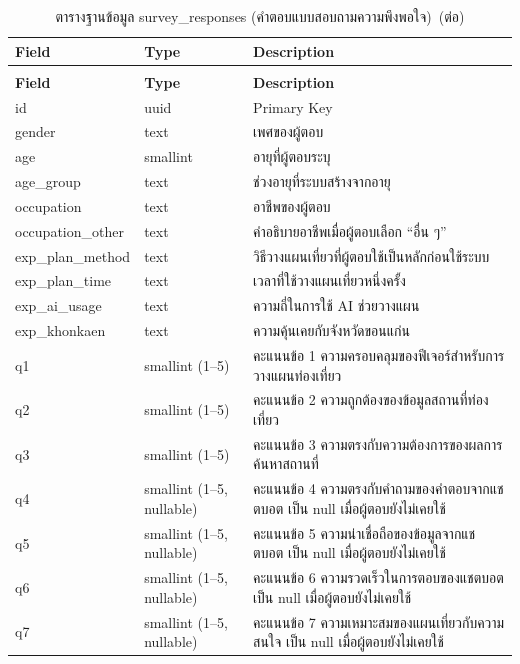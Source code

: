 \begin{longtable}{|p{3.6cm}|p{2.6cm}|p{6.8cm}|}
\caption{ตารางฐานข้อมูล survey\_responses (คำตอบแบบสอบถามความพึงพอใจ)}\label{tab:db_survey}\\
\hline
\textbf{Field} & \textbf{Type} & \textbf{Description} \\
\hline
\endfirsthead
\caption[]{ตารางฐานข้อมูล survey\_responses (คำตอบแบบสอบถามความพึงพอใจ)~(\textnormal{ต่อ})}\\
\hline
\textbf{Field} & \textbf{Type} & \textbf{Description} \\
\hline
\endhead
id & uuid & Primary Key \\ \hline
gender & text & เพศของผู้ตอบ \\ \hline
age & smallint & อายุที่ผู้ตอบระบุ \\ \hline
age\_group & text & ช่วงอายุที่ระบบสร้างจากอายุ \\ \hline
occupation & text & อาชีพของผู้ตอบ \\ \hline
occupation\_other & text & คำอธิบายอาชีพเมื่อผู้ตอบเลือก ``อื่น ๆ'' \\ \hline
exp\_plan\_method & text & วิธีวางแผนเที่ยวที่ผู้ตอบใช้เป็นหลักก่อนใช้ระบบ \\ \hline
exp\_plan\_time & text & เวลาที่ใช้วางแผนเที่ยวหนึ่งครั้ง \\ \hline
exp\_ai\_usage & text & ความถี่ในการใช้ AI ช่วยวางแผน \\ \hline
exp\_khonkaen & text & ความคุ้นเคยกับจังหวัดขอนแก่น \\ \hline
q1 & smallint (1--5) & คะแนนข้อ 1 ความครอบคลุมของฟีเจอร์สำหรับการวางแผนท่องเที่ยว \\ \hline
q2 & smallint (1--5) & คะแนนข้อ 2 ความถูกต้องของข้อมูลสถานที่ท่องเที่ยว \\ \hline
q3 & smallint (1--5) & คะแนนข้อ 3 ความตรงกับความต้องการของผลการค้นหาสถานที่ \\ \hline
q4 & smallint (1--5, nullable) & คะแนนข้อ 4 ความตรงกับคำถามของคำตอบจากแชตบอต เป็น null เมื่อผู้ตอบยังไม่เคยใช้ \\ \hline
q5 & smallint (1--5, nullable) & คะแนนข้อ 5 ความน่าเชื่อถือของข้อมูลจากแชตบอต เป็น null เมื่อผู้ตอบยังไม่เคยใช้ \\ \hline
q6 & smallint (1--5, nullable) & คะแนนข้อ 6 ความรวดเร็วในการตอบของแชตบอต เป็น null เมื่อผู้ตอบยังไม่เคยใช้ \\ \hline
q7 & smallint (1--5, nullable) & คะแนนข้อ 7 ความเหมาะสมของแผนเที่ยวกับความสนใจ เป็น null เมื่อผู้ตอบยังไม่เคยใช้ \\ \hline

\end{longtable}
